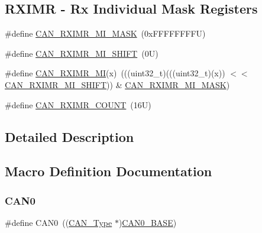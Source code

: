 \subsection*{R\+X\+I\+MR -\/ Rx Individual Mask Registers}
\begin{DoxyCompactItemize}
\item 
\#define \mbox{\hyperlink{group___c_a_n___register___masks_ga3cef91282e43c8e5d2c30e65d375f964}{C\+A\+N\+\_\+\+R\+X\+I\+M\+R\+\_\+\+M\+I\+\_\+\+M\+A\+SK}}~(0x\+F\+F\+F\+F\+F\+F\+F\+F\+U)
\item 
\#define \mbox{\hyperlink{group___c_a_n___register___masks_gae3dd7acc84e521ca0a05beb33f7b434c}{C\+A\+N\+\_\+\+R\+X\+I\+M\+R\+\_\+\+M\+I\+\_\+\+S\+H\+I\+FT}}~(0\+U)
\item 
\#define \mbox{\hyperlink{group___c_a_n___register___masks_gae80c7ae8e847975c034fb39476b6a840}{C\+A\+N\+\_\+\+R\+X\+I\+M\+R\+\_\+\+MI}}(x)~(((uint32\+\_\+t)(((uint32\+\_\+t)(x)) $<$$<$ \mbox{\hyperlink{group___c_a_n___register___masks_gae3dd7acc84e521ca0a05beb33f7b434c}{C\+A\+N\+\_\+\+R\+X\+I\+M\+R\+\_\+\+M\+I\+\_\+\+S\+H\+I\+FT}})) \& \mbox{\hyperlink{group___c_a_n___register___masks_ga3cef91282e43c8e5d2c30e65d375f964}{C\+A\+N\+\_\+\+R\+X\+I\+M\+R\+\_\+\+M\+I\+\_\+\+M\+A\+SK}})
\item 
\#define \mbox{\hyperlink{group___c_a_n___register___masks_gaf43c8a3f50f289b5bb877205570ac1cc}{C\+A\+N\+\_\+\+R\+X\+I\+M\+R\+\_\+\+C\+O\+U\+NT}}~(16\+U)
\end{DoxyCompactItemize}


\subsection{Detailed Description}


\subsection{Macro Definition Documentation}
\mbox{\label{group___c_a_n___register___masks_ga8882ee5d18ec64b8193396ec6bc66fe5}} 
\subsubsection{\texorpdfstring{C\+A\+N0}{CAN0}}
{\footnotesize\ttfamily \#define C\+A\+N0~((\mbox{\hyperlink{struct_c_a_n___type}{C\+A\+N\+\_\+\+Type}} $\ast$)\mbox{\hyperlink{group___c_a_n___register___masks_gaf28059909d16b304a2d26930aac760fd}{C\+A\+N0\+\_\+\+B\+A\+SE}})}


